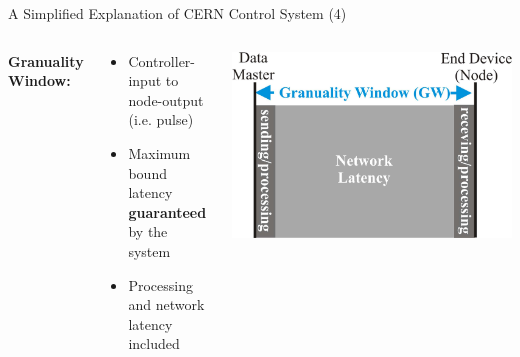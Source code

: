 \documentclass[compress,red]{beamer}
\begin{document}
\begin{frame}{A Simplified Explanation of CERN Control System (4)}

\begin{columns}[c]
   {\bf Granuality Window: }
    \begin{center}
      \begin{itemize}
	    \item Controller-input to node-output (i.e. pulse)
	    \item Maximum bound latency {\bf guaranteed } by the system
	    \item Processing and network latency included
      \end{itemize}

    \end{center}
    \begin{center}
      \begin{center}
      \includegraphics[width=.8\textwidth]{applications/CERN/gw.pdf}
      \end{center}
    \end{center}
\end{columns}

\end{frame}
\end{document}
